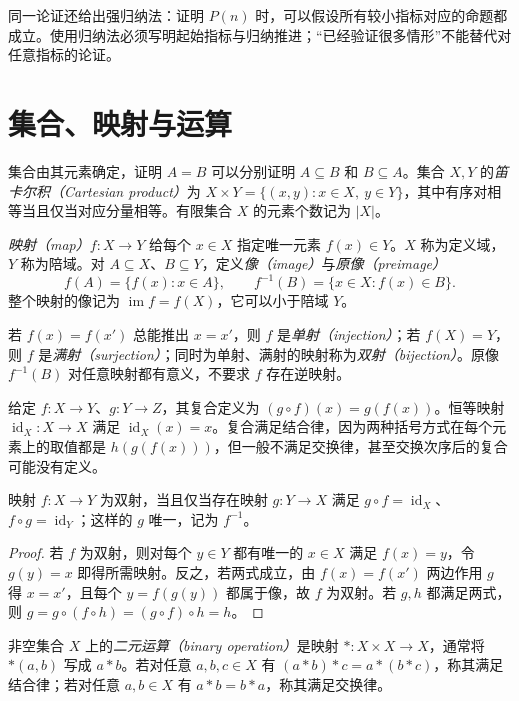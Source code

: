 同一论证还给出强归纳法：证明 $P(n)$ 时，可以假设所有较小指标对应的命题都成立。使用归纳法必须写明起始指标与归纳推进；“已经验证很多情形”不能替代对任意指标的论证。

\section{集合、映射与运算}\label{sec:maps-operations}

集合由其元素确定，证明 $A=B$ 可以分别证明 $A\subseteq B$ 和 $B\subseteq A$。集合 $X,Y$ 的\emph{笛卡尔积（Cartesian product）}为 $X\times Y=\{(x,y):x\in X,\ y\in Y\}$，其中有序对相等当且仅当对应分量相等。有限集合 $X$ 的元素个数记为 $|X|$。

\begin{definition}[映射与像]
\emph{映射（map）}$f:X\to Y$ 给每个 $x\in X$ 指定唯一元素 $f(x)\in Y$。$X$ 称为定义域，$Y$ 称为陪域。对 $A\subseteq X$、$B\subseteq Y$，定义\emph{像（image）}与\emph{原像（preimage）}
\[
  f(A)=\{f(x):x\in A\},\qquad
  f^{-1}(B)=\{x\in X:f(x)\in B\}.
\]
整个映射的像记为 $\operatorname{im}f=f(X)$，它可以小于陪域 $Y$。
\end{definition}

若 $f(x)=f(x')$ 总能推出 $x=x'$，则 $f$ 是\emph{单射（injection）}；若 $f(X)=Y$，则 $f$ 是\emph{满射（surjection）}；同时为单射、满射的映射称为\emph{双射（bijection）}。原像 $f^{-1}(B)$ 对任意映射都有意义，不要求 $f$ 存在逆映射。

给定 $f:X\to Y$、$g:Y\to Z$，其复合定义为 $(g\circ f)(x)=g(f(x))$。恒等映射 $\operatorname{id}_X:X\to X$ 满足 $\operatorname{id}_X(x)=x$。复合满足结合律，因为两种括号方式在每个元素上的取值都是 $h(g(f(x)))$，但一般不满足交换律，甚至交换次序后的复合可能没有定义。

\begin{proposition}[双射与逆映射]\label{prop:inverse-map}
映射 $f:X\to Y$ 为双射，当且仅当存在映射 $g:Y\to X$ 满足 $g\circ f=\operatorname{id}_X$、$f\circ g=\operatorname{id}_Y$；这样的 $g$ 唯一，记为 $f^{-1}$。
\end{proposition}
\begin{proof}
若 $f$ 为双射，则对每个 $y\in Y$ 都有唯一的 $x\in X$ 满足 $f(x)=y$，令 $g(y)=x$ 即得所需映射。反之，若两式成立，由 $f(x)=f(x')$ 两边作用 $g$ 得 $x=x'$，且每个 $y=f(g(y))$ 都属于像，故 $f$ 为双射。若 $g,h$ 都满足两式，则 $g=g\circ(f\circ h)=(g\circ f)\circ h=h$。
\end{proof}

\begin{definition}[二元运算]
非空集合 $X$ 上的\emph{二元运算（binary operation）}是映射 $*:X\times X\to X$，通常将 $*(a,b)$ 写成 $a*b$。若对任意 $a,b,c\in X$ 有 $(a*b)*c=a*(b*c)$，称其满足结合律；若对任意 $a,b\in X$ 有 $a*b=b*a$，称其满足交换律。
\end{definition}

